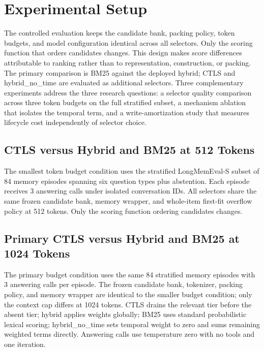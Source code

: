 \section{Experimental Setup}

\label{sec:experiments}

The controlled evaluation keeps the candidate bank, packing policy, token budgets, and model configuration identical across all selectors. Only the scoring function that orders candidates changes. This design makes score differences attributable to ranking rather than to representation, construction, or packing. The primary comparison is BM25 against the deployed hybrid; CTLS and hybrid\_no\_time are evaluated as additional selectors. Three complementary experiments address the three research questions: a selector quality comparison across three token budgets on the full stratified subset, a mechanism ablation that isolates the temporal term, and a write-amortization study that measures lifecycle cost independently of selector choice.

\subsection{CTLS versus Hybrid and BM25 at 512 Tokens}

\label{sec:setup_fair_baselines_512}

The smallest token budget condition uses the stratified LongMemEval-S subset of 84 memory episodes spanning six question types plus abstention. Each episode receives 3 answering calls under isolated conversation IDs. All selectors share the same frozen candidate bank, memory wrapper, and whole-item first-fit overflow policy at 512 tokens. Only the scoring function ordering candidates changes.

\subsection{Primary CTLS versus Hybrid and BM25 at 1024 Tokens}

\label{sec:setup_fair_baselines}

The primary budget condition uses the same 84 stratified memory episodes with 3 answering calls per episode. The frozen candidate bank, tokenizer, packing policy, and memory wrapper are identical to the smaller budget condition; only the context cap differs at 1024 tokens. CTLS drains the relevant tier before the absent tier; hybrid applies weights globally; BM25 uses standard probabilistic lexical scoring; hybrid\_no\_time sets temporal weight to zero and sums remaining weighted terms directly. Answering calls use temperature zero with no tools and one iteration.

